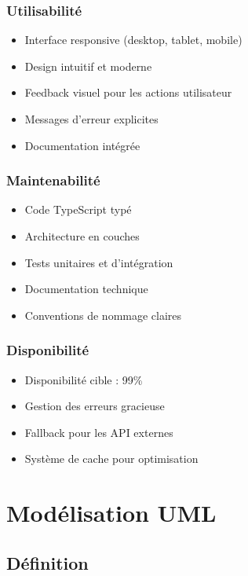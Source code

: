 \subsubsection{Utilisabilité}

\begin{itemize}
    \item Interface responsive (desktop, tablet, mobile)
    \item Design intuitif et moderne
    \item Feedback visuel pour les actions utilisateur
    \item Messages d'erreur explicites
    \item Documentation intégrée
\end{itemize}

\subsubsection{Maintenabilité}

\begin{itemize}
    \item Code TypeScript typé
    \item Architecture en couches
    \item Tests unitaires et d'intégration
    \item Documentation technique
    \item Conventions de nommage claires
\end{itemize}

\subsubsection{Disponibilité}

\begin{itemize}
    \item Disponibilité cible : 99\%
    \item Gestion des erreurs gracieuse
    \item Fallback pour les API externes
    \item Système de cache pour optimisation
\end{itemize}

\section{Modélisation UML}

\subsection{Définition}

